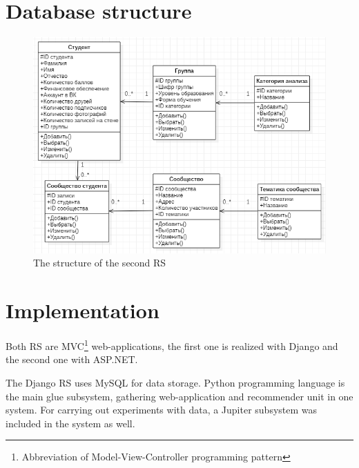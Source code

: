 \documentclass[conference,a4]{IEEEtran}
\begin{document}
\section{Database structure}

\begin{figure}\centering

  \includegraphics[width=\linewidth]{pics/2-obj-stru.png}

  \caption{The structure of the second RS}
  \label{fig:2-struct}
\end{figure}
\section{Implementation}

Both RS are MVC\footnote{Abbreviation of Model-View-Controller programming pattern} web-applications, the first one is realized with Django and the second one with ASP.NET.

The Django RS uses MySQL for data storage.  Python programming language is the main glue subsystem, gathering web-application and recommender unit in one system.  For carrying out experiments with data, a Jupiter subsystem was included in the system as well.
\end{document}
